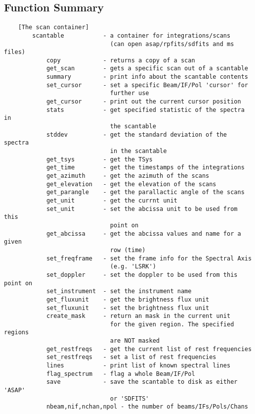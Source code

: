 \documentclass[11pt]{article}
\begin{document}
\subsection{Function Summary}

%
\begin{verbatim}
    [The scan container]
        scantable           - a container for integrations/scans
                              (can open asap/rpfits/sdfits and ms files)
            copy            - returns a copy of a scan
            get_scan        - gets a specific scan out of a scantable
            summary         - print info about the scantable contents
            set_cursor      - set a specific Beam/IF/Pol 'cursor' for
                              further use
            get_cursor      - print out the current cursor position
            stats           - get specified statistic of the spectra in
                              the scantable
            stddev          - get the standard deviation of the spectra
                              in the scantable
            get_tsys        - get the TSys
            get_time        - get the timestamps of the integrations
            get_azimuth     - get the azimuth of the scans
            get_elevation   - get the elevation of the scans
            get_parangle    - get the parallactic angle of the scans
            get_unit        - get the currnt unit
            set_unit        - set the abcissa unit to be used from this
                              point on
            get_abcissa     - get the abcissa values and name for a given
                              row (time)
            set_freqframe   - set the frame info for the Spectral Axis
                              (e.g. 'LSRK')
            set_doppler     - set the doppler to be used from this point on
            set_instrument  - set the instrument name
            get_fluxunit    - get the brightness flux unit
            set_fluxunit    - set the brightness flux unit
            create_mask     - return an mask in the current unit
                              for the given region. The specified regions
                              are NOT masked
            get_restfreqs   - get the current list of rest frequencies
            set_restfreqs   - set a list of rest frequencies
            lines           - print list of known spectral lines
            flag_spectrum   - flag a whole Beam/IF/Pol
            save            - save the scantable to disk as either 'ASAP'
                              or 'SDFITS'
            nbeam,nif,nchan,npol - the number of beams/IFs/Pols/Chans

\end{verbatim}
\end{document}
